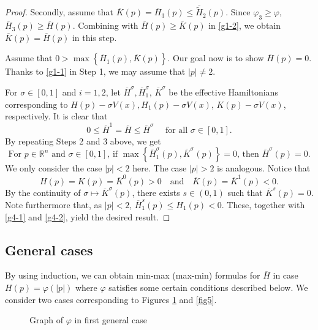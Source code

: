 \documentclass[12pt,reqno]{amsart}
\theoremstyle{plain}
\theoremstyle{remark}
\numberwithin{equation}{section}
\newcommand{\R}{\mathbb{R}}
\newcommand{\sig}{\sigma}
\newcommand{\ol}{\overline}
\begin{document}
\begin{proof}
Secondly, assume that $\ol{K}(p) = \ol{H}_3(p) \leq  \ol{\tilde H}_2(p)$. Since $\varphi_3\geq \varphi$,   $\ol{H}_3(p)\geq  \ol{H}(p)$.   
Combining with $ \ol{H}(p)\geq  \ol{K}(p)$ in \eqref{g1-2}, we obtain  $\ol{K}(p)= \ol{H}(p)$ in this step.  
\smallskip

Assume that $0> \max\left\{\ol{H}_1(p), \ol{K}(p)\right\}$.
Our goal now is to show $\ol{H}(p)=0$.
Thanks to \eqref{g1-1} in Step 1, we may assume that $|p| \neq 2$.

For $\sig \in [0,1]$ and $i=1,2$, let $\ol{H}^\sig, \ol{H}_1^\sig$, $\ol{K}^\sig$ be the effective Hamiltonians corresponding to $H(p)-\sig V(x), H_1(p) - \sig V(x)$, $K(p)-\sig V(x)$, respectively. It is clear that
\begin{equation}\label{g4-1}
0 \leq \ol{H}^1=\ol{H} \leq \ol{H}^\sig \quad \text{ for all } \sig \in [0,1].
\end{equation}
By repeating Steps 2 and 3 above, we get 
\begin{equation} \label{g4-2}
\text{For $p\in\R^n$ and $\sig \in [0,1]$, if $\max\left\{\ol{H}^\sig_1(p),\ol{K}^\sig(p)\right\}=0$, then $\ol{H}^\sig(p)=0$.}
\end{equation}
We only consider the case $|p|<2$ here.
The case $|p|>2$ is analogous. Notice that
\[
H(p)= K(p) = \ol{K}^0(p)>0 \quad \text{and} \quad \ol{K}(p)= \ol{K}^1(p) <0.
\]
By the continuity of $\sig \mapsto \ol{K}^\sig(p)$, there exists $s \in (0,1)$ such that $\ol{K}^s(p)=0$.
Note furthermore that, as $|p|<2$, $\ol{H}_1^s(p) \leq H_1(p) <0$.
These, together with \eqref{g4-1} and \eqref{g4-2}, yield the desired result.
\end{proof}

\subsection{General cases}\label{generalcase}
By using induction, 
we can obtain min-max (max-min) formulas for $\ol{H}$ in case $H(p)=\varphi(|p|)$ where $\varphi$ satisfies some certain conditions described below.
We consider two cases corresponding to Figures \ref{fig4} and \ref{fig5}.
\begin{figure}[h] 
\begin{center}

\caption{Graph of $\varphi$ in first general case}
\label{fig4}
\end{center}
\end{figure}
\end{document}

